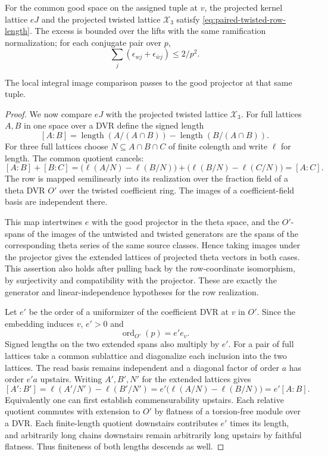 \begin{proposition}
\label{prop:paired-twisted-row-index}
For the common good space on the assigned tuple at \(v\), the
projected kernel lattice \(eJ\) and the projected twisted lattice
\(\mathcal X_3\) satisfy \eqref{eq:paired-twisted-row-length}. The excess is bounded over
the lifts with the same ramification normalization; for each conjugate pair over \(p\),
\[
 \sum_j(\epsilon_{wj}+\epsilon_{\bar wj})\le 2/p^2.
\]

The local integral image comparison passes to the good projector
at that same tuple.
\end{proposition}

\begin{proof}
We now compare \(eJ\) with the projected twisted lattice
\(\mathcal X_3\). For full lattices \(A,B\) in one space over
a DVR define the signed length
\[
 [A:B]=\operatorname{length}(A/(A\cap B))-
        \operatorname{length}(B/(A\cap B)).
\]
For three full lattices choose \(N\subseteq A\cap B\cap C\) of finite
colength and write \(\ell\) for length. The common quotient cancels:
\[
 [A:B]+[B:C]
 =\bigl(\ell(A/N)-\ell(B/N)\bigr)+\bigl(\ell(B/N)-\ell(C/N)\bigr)
 =[A:C].
\] The row is mapped semilinearly into its realization over the fraction field of a theta DVR
\(O'\) over the twisted coefficient ring. The images of a
coefficient-field basis are independent there.

This map intertwines \(e\) with the good projector in the theta
space, and the \(O'\)-spans of the images of the untwisted and twisted generators are the spans of the corresponding
theta series of the same source classes. Hence taking images
under the projector gives the extended lattices of projected
theta vectors in both cases. This assertion also holds after
pulling back by the row-coordinate isomorphism, by surjectivity
and compatibility with the projector. These are exactly the
generator and linear-independence hypotheses for the row realization.\label{cor:paired-twist-index-3}

Let \(e'\) be the order of a uniformizer of the coefficient
DVR at \(v\) in \(O'\). Since the embedding induces \(v\),
\(e'>0\) and 
\[
  \operatorname{ord}_{O'}(p)=e'e_v.
\]
 Signed
lengths on the two extended spans also multiply by \(e'\).
For a pair of full lattices take a common sublattice and
diagonalize each inclusion into the two lattices. The read
basis remains independent and a diagonal factor of order \(a\) has order \(e'a\) upstairs.
Writing \(A',B',N'\) for the extended lattices gives
\[
 [A':B']=\ell(A'/N')-\ell(B'/N')
        =e'\bigl(\ell(A/N)-\ell(B/N)\bigr)=e'[A:B].
\]
Equivalently one can first establish commensurability upstairs.
Each relative quotient commutes with extension to \(O'\)
by flatness of a torsion-free module over a DVR.
Each finite-length quotient downstairs contributes \(e'\)
times its length, and arbitrarily long chains downstairs
remain arbitrarily long upstairs by faithful flatness.
Thus finiteness of both lengths descends as well.


\end{proof}
